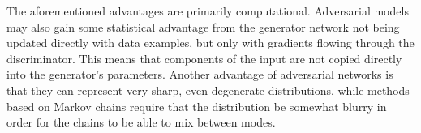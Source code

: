 \documentclass{article} %
\begin{document}
The aforementioned advantages are primarily computational. Adversarial models may
also gain some statistical advantage from the generator network not being updated
directly with data examples, but only with gradients flowing through the discriminator.
This means that components of the input are not copied directly into the generator's
parameters. Another advantage of adversarial networks is that they can represent
very sharp, even degenerate distributions, while methods based on Markov chains require
that the distribution be somewhat blurry in order for the chains to be able to mix
between modes.



\end{document}

